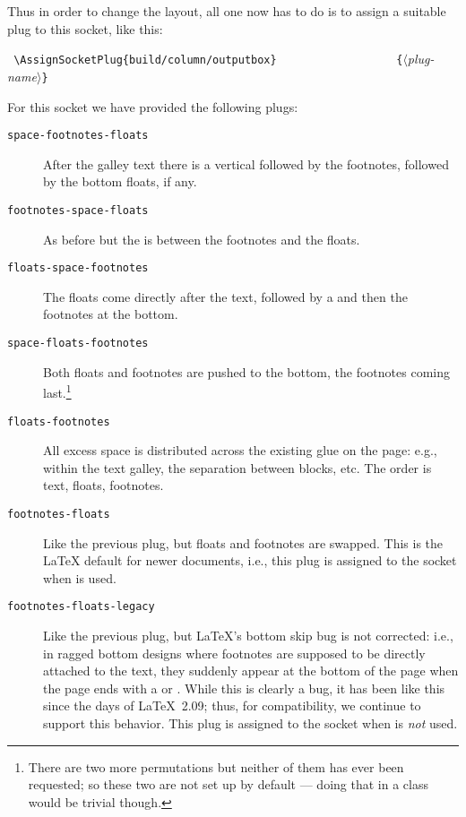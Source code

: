 \documentclass{ltnews}
\providecommand\plug[1]{\texttt{#1}}
\providecommand\meta[1]{$\langle$\textrm{\itshape#1}$\rangle$}
\begin{document}
Thus in order to change the layout, all one now has to do is to assign
a suitable plug to this socket, like this:
\begin{flushleft}
  \verb= \AssignSocketPlug{build/column/outputbox}=
  \verb=                  {=\meta{plug-name}\verb=}=
\end{flushleft}
%
For this socket we have provided the following plugs:
\begin{description}
\item[\plug{space-footnotes-floats}]

   After the galley text there is a vertical  followed by the
   footnotes, followed by the bottom floats, if any.

\item[\plug{footnotes-space-floats}]

   As before but the  is between the footnotes and the
   floats.

\item[\plug{floats-space-footnotes}]

   The floats come directly after the text, followed by a 
   and then the footnotes at the bottom.

\item[\plug{space-floats-footnotes}]

   Both floats and footnotes are pushed to the bottom, the footnotes
   coming last.\footnote{There are two more permutations but neither
   of them has ever been requested; so these two are not set up by
   default --- doing that in a class would be trivial though.}

\item[\plug{floats-footnotes}]

   All excess space is distributed across the existing glue on the
   page: e.g., within the text galley, the separation between blocks,
   etc.  The order is text, floats, footnotes.

\item[\plug{footnotes-floats}]

   Like the previous plug, but floats and footnotes are swapped. This
   is the \LaTeX{} default for newer documents, i.e., this plug is
   assigned to the socket when  is used.

\item[\plug{footnotes-floats-legacy}]

   Like the previous plug, but \LaTeX{}'s bottom skip bug is not
   corrected: i.e., in ragged bottom designs where footnotes are
   supposed to be directly attached to the text, they suddenly appear
   at the bottom of the page when the page ends with a  or
   .  While this is clearly a bug, it has been like this
   since the days of \LaTeX~2.09; thus, for compatibility, we continue
   to support this behavior.  This plug is assigned to the socket when
    is \emph{not} used.
\end{description}
\end{document}
